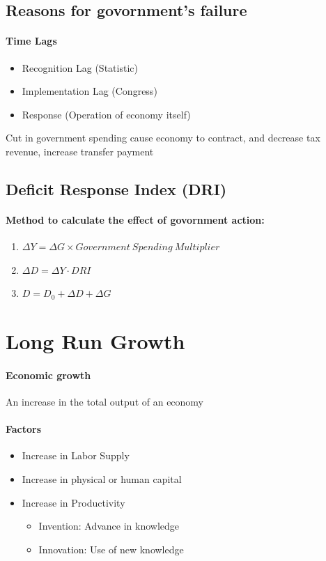 \documentclass[11pt]{article}
\begin{document}
\subsection{Reasons for govornment's failure}
\paragraph{Time Lags}
\begin{itemize}
    \item Recognition Lag (Statistic)
    \item Implementation Lag (Congress)
    \item Response (Operation of economy itself)
\end{itemize}

Cut in government spending cause economy to contract, and decrease tax revenue, increase transfer payment

\subsection{Deficit Response Index (DRI)}
\paragraph{Method to calculate the effect of govornment action:}
\begin{enumerate}
    \item $\Delta Y = \Delta G \times Government\ Spending\ Multiplier$
    \item $\Delta D = \Delta Y \cdot DRI$
    \item $D = D_0 + \Delta D + \Delta G$
\end{enumerate}

\section{Long Run Growth}
\paragraph{Economic growth}
An increase in the total output of an economy

\paragraph{Factors}
\begin{itemize}
    \item Increase in Labor Supply
    \item Increase in physical or human capital
    \item Increase in Productivity
    \begin{itemize}
        \item Invention: Advance in knowledge
        \item Innovation: Use of new knowledge
    \end{itemize}
\end{itemize}
\end{document}
